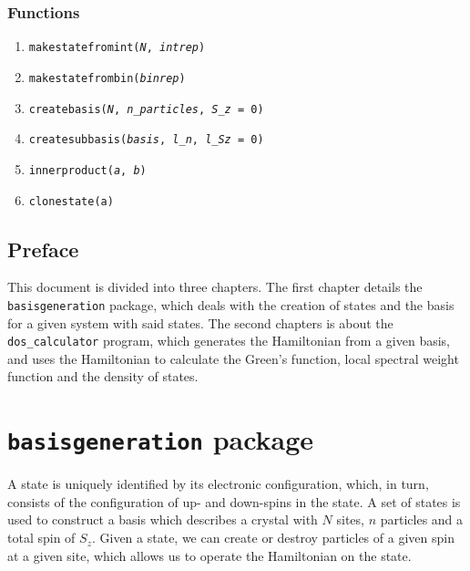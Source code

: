 \documentclass[]{book}
\begin{document}
\subsection*{Functions}

\begin{enumerate}
\item \texttt{makestatefromint(\textit{N}, \textit{intrep})}
\item \texttt{makestatefrombin(\textit{binrep})}
\item \texttt{createbasis(\textit{N}, \textit{n\_particles}, \textit{S\_z} = 0)}
\item \texttt{createsubbasis(\textit{basis}, \textit{l\_n}, \textit{l\_Sz} = 0)}
\item \texttt{innerproduct(\textit{a}, \textit{b})}
\item \texttt{clonestate(a)}
\end{enumerate}

\newpage
\section*{Preface}
This document is divided into three chapters. The first chapter details the \texttt{basisgeneration} package, which deals with the creation of states and the basis for a given system with said states. The second chapters is about the \texttt{dos\_calculator} program, which generates the Hamiltonian from a given basis, and uses the Hamiltonian to calculate the Green's function, local spectral weight function and the density of states.

\tableofcontents

\mainmatter

\chapter{\texttt{basisgeneration} package}
A state is uniquely identified by its electronic configuration, which, in turn, consists of the configuration of up- and down-spins in the state. A set of states is used to construct a basis which describes a crystal with $N$ sites, $n$ particles and a total spin of $S_z$. Given a state, we can create or destroy particles of a given spin at a given site, which allows us to operate the Hamiltonian on the state.
\end{document}
